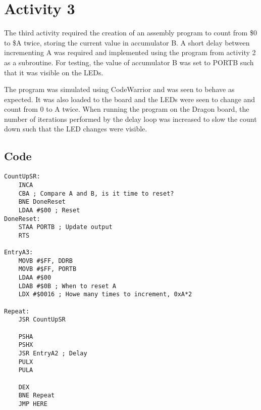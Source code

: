 \section{Activity 3}

The third activity required the creation of an assembly program to count from \$0 to \$A twice, storing the current value in accumulator B. 
A short delay between incrementing A was required and implemented using the program from activity 2 as a subroutine.
For testing, the value of accumulator B was set to PORTB such that it was visible on the LEDs.

The program was simulated using CodeWarrior and was seen to behave as expected.
It was also loaded to the board and the LEDs were seen to change and count from 0 to A twice.
When running the program on the Dragon board, the number of iterations performed by the delay loop was increased to slow the count down such that the LED changes were visible.

\subsection{Code}

{\footnotesize
\begin{lstlisting}
CountUpSR:
	INCA
	CBA ; Compare A and B, is it time to reset? 
	BNE DoneReset
	LDAA #$00 ; Reset
DoneReset:
	STAA PORTB ; Update output
	RTS

EntryA3:
	MOVB #$FF, DDRB
	MOVB #$FF, PORTB
	LDAA #$00
	LDAB #$0B ; When to reset A
	LDX #$0016 ; Howe many times to increment, 0xA*2

Repeat:
	JSR CountUpSR
	
	PSHA
	PSHX
	JSR EntryA2 ; Delay
	PULX
	PULA
	
	DEX
	BNE Repeat
	JMP HERE
\end{lstlisting}
}